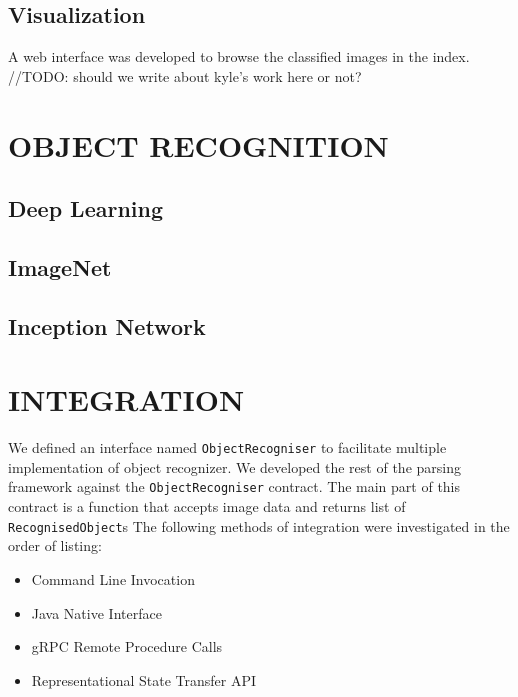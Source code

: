\documentclass[letterpaper, 10 pt, conference]{ieeeconf}  %
\begin{document}
\subsection{Visualization} \label{sec:memex-visualization}
A web interface was developed to browse the classified images in the index. //TODO: should we write about kyle's work here or not?

\section{OBJECT RECOGNITION} \label{sec:obj-rec}

\subsection{Deep Learning } \label{sec:deeplearning-imagenet}
\subsection{ImageNet} \label{sec:imagenet}

\subsection{Inception Network } \label{sec:inceptionnet}

\section{INTEGRATION} \label{sec:integration}
We defined an interface named \texttt{ObjectRecogniser} to facilitate multiple implementation of object recognizer. We developed the rest of the parsing framework against the \texttt{ObjectRecogniser} contract. The main part of this contract is a function that accepts image data and returns list of \texttt{RecognisedObject}s
The following methods of integration were investigated in the order of listing:
\begin{itemize}
\item Command Line Invocation
\item Java Native Interface
\item gRPC Remote Procedure Calls
\item Representational State Transfer API
\end{itemize}
\end{document}
